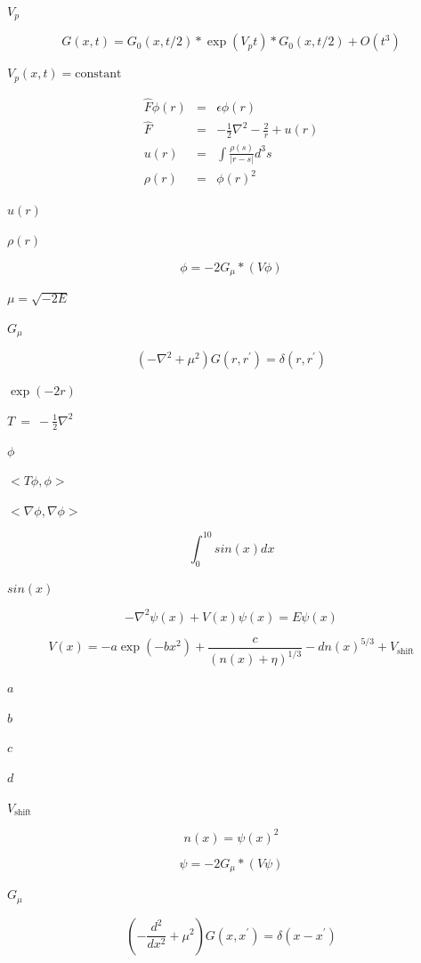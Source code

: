 \documentclass{article}
\begin{document}
$ V_p $
\pagebreak

\[
  G(x,t) = G_0(x,t/2) * \exp(V_p t) * G_0(x,t/2) + O(t^3)
\]
\pagebreak

$ V_p(x,t)=\mbox{constant} $
\pagebreak

\begin{eqnarray*}
   \hat{F} \phi(r) &=& \epsilon \phi(r) \\
   \hat{F} &=& -\frac{1}{2} \nabla^2 - \frac{2}{r} + u(r) \\
   u(r) &=& \int \frac{\rho(s)}{| r - s |} d^3s \\
   \rho(r) &=& \phi(r)^2
\end{eqnarray*}
\pagebreak

$ u(r) $
\pagebreak

$ \rho(r) $
\pagebreak

\[
    \phi = - 2 G_{\mu} * ( V \phi)
\]
\pagebreak

$ \mu = \sqrt{-2E} $
\pagebreak

$G_{\mu}$
\pagebreak

\[
    \left( - \nabla^2 + \mu^2  \right) G(r,r^{\prime}) = \delta(r,r^{\prime})
\]
\pagebreak

$ \exp(-2r) $
\pagebreak

$T~=~-\frac{1}{2}
\nabla^2 $
\pagebreak

$ \phi $
\pagebreak

$ <T \phi, \phi >
$
\pagebreak

$ < \nabla \phi, \nabla \phi >
$
\pagebreak

\[
   \int_0^{10} sin(x) dx
\]
\pagebreak

$ sin(x) $
\pagebreak

\[
-\nabla^2 \psi(x) + V(x) \psi(x) = E \psi(x)
\]
\pagebreak

\[
V(x) = -a \exp(-b x^2) + \frac{c}{(n(x)+\eta)^{1/3}} - d n(x)^{5/3} + V_{\mbox{shift}}
\]
\pagebreak

$ a $
\pagebreak

$ b $
\pagebreak

$ c $
\pagebreak

$ d $
\pagebreak

$ V_{\mbox{shift}} $
\pagebreak

\[
n(x) = \psi(x)^2
\]
\pagebreak

\[
   \psi = - 2 G_{\mu} * \left ( V \psi \right)
\]
\pagebreak

$ G_{\mu}$
\pagebreak

\[
   \left( - \frac{d^2}{dx^2} + \mu^2 \right) G(x,x^{\prime}) = \delta(x-x^{\prime})
\]
\pagebreak
\end{document}
